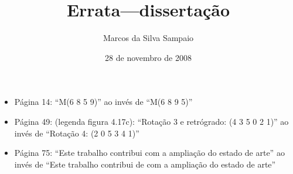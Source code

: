 \documentclass[brazil,12pt]{article}
\title{Errata---dissertação}
\author{Marcos da Silva Sampaio}
\date{28 de novembro de 2008}
\begin{document}
\maketitle

\begin{itemize}
\item Página 14: ``M(6 8 5 9)'' ao invés de ``M(6 8 9 5)''
\item Página 49: (legenda figura 4.17c): ``Rotação 3 e retrógrado: (4
  3 5 0 2 1)'' ao invés de ``Rotação 4: (2 0 5 3 4 1)''
\item Página 75: ``Este trabalho contribui com a ampliação do estado
  de arte'' ao invés de ``Este trabalho contribui de com a ampliação
  do estado de arte''
\end{itemize}
\end{document}
